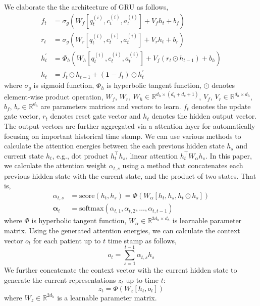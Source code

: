 We elaborate the the architecture of GRU as follows,
\begin{equation}
\label{eq:gru}
\begin{aligned}
    f_t &=\sigma_{g}(W_{f}[q^{(i)}_t,c^{(i)}_t,a^{(i)}_t]+V_{f}h_t+b_{f})\\
    r_{t} &=\sigma_{g}(W_{r}[q^{(i)}_t,c^{(i)}_t,a^{(i)}_t]+V_{r}h_t+b_{r})\\
    h^{\prime}_t &=\Phi_{h}(W_{h}[q^{(i)}_t,c^{(i)}_t,a^{(i)}_t]+V_{f}(r_{t}\odot h_{t-1})+b_{h})\\
    h_t &=f_t\odot h_{t-1}+(\textbf{1}-f_t)\odot h^{\prime}_t
\end{aligned}
\end{equation}
where $\sigma_{g}$ is sigmoid function, $\Phi_{h}$ is hyperbolic tangent function, $\odot$ denotes element-wise product operation, $W_{f}$, $W_{r}$, $W_{h}\in\mathbb{R}^{d_{h}\times (d_{q}+d_{c}+1)}$, $V_{f}$, $V_{r}\in\mathbb{R}^{d_{h}\times d_{h}}$, $b_{f}$, $b_{r}\in\mathbb{R}^{d_h}$ are parameters matrices and vectors to learn. $f_t$ denotes the update gate vector, $r_t$ denotes reset gate vector and $h_t$ denotes the hidden output vector. The output vectors are further aggregated via a attention layer for automatically focusing on important historical time stamp. We can use various methods to calculate the attention energies between the each previous hidden state $h_{s}$ and current state $h_t$, e.g., dot product $h^{\top}_t h_{s}$, linear attention $h^{\top}_t W_{\alpha} h_{s}$. In this paper, we calculate the attention weight $\alpha_{t,s}$ using a method that concatenates each previous hidden state with the current state, and the product of two states. That is,
\begin{equation}
\label{eq:attention}
\begin{aligned}
    \alpha_{t,s} &=\text{score}(h_t, h_s)=\Phi(W_{\alpha}[h_t,h_s,h_t\odot h_s])\\
    \mathbf{\alpha}_t &=\text{softmax}(\alpha_{t,1},\alpha_{t,2},\dots,\alpha_{t,t-1})
\end{aligned}
\end{equation}
where $\Phi$ is hyperbolic tangent function, $W_\alpha\in\mathbb{R}^{3d_h\times d_h}$ is learnable parameter matrix. Using the generated attention energies, we can calculate the context vector $o_t$ for each patient up to $t$ time stamp as follows,
\begin{equation}
\label{eq:context-vector}
    o_t=\sum_{s=1}^{t-1}\alpha_{t,s}h_s
\end{equation}
We further concatenate the context vector with the current hidden state to generate the current representations $z_t$ up to time $t$:
\begin{equation}
\label{eq:hidden-confounding}
    z_t=\Phi(W_{z}[h_t,o_t])
\end{equation}
where $W_z\in\mathbb{R}^{2d_{h}}$ is a learnable parameter matrix.



